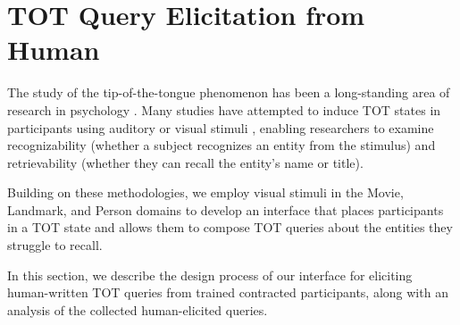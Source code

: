 \section{TOT Query Elicitation from Human}\label{sec:human-elicitation}


The study of the tip-of-the-tongue phenomenon has been a long-standing area of research in psychology \cite{burke1991tip, jones1989back}. Many studies have attempted to induce TOT states in participants using auditory \cite{reefer1995name} or visual stimuli \cite{tranel2005landmarks}, enabling researchers to examine recognizability (whether a subject recognizes an entity from the stimulus) and retrievability (whether they can recall the entity's name or title).

Building on these methodologies, we employ visual stimuli in the Movie, Landmark, and Person domains to develop an interface that places participants in a TOT state and allows them to compose TOT queries about the entities they struggle to recall.

In this section, we describe the design process of our interface for eliciting human-written TOT queries from trained contracted participants, along with an analysis of the collected human-elicited queries.


